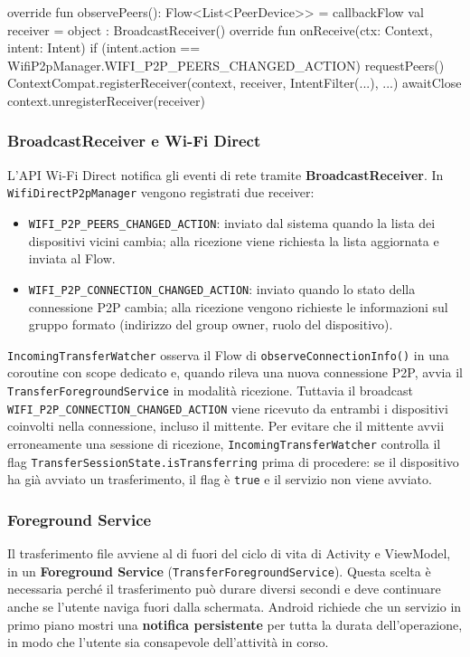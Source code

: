 \begin{codeblock}[language=Kotlin]
override fun observePeers(): Flow<List<PeerDevice>> = callbackFlow {
    val receiver = object : BroadcastReceiver() {
        override fun onReceive(ctx: Context, intent: Intent) {
            if (intent.action == WifiP2pManager.WIFI_P2P_PEERS_CHANGED_ACTION)
                requestPeers()
        }
    }
    ContextCompat.registerReceiver(context, receiver, IntentFilter(...), ...)
    awaitClose { context.unregisterReceiver(receiver) }
}
\end{codeblock}

\subsubsection*{BroadcastReceiver e Wi-Fi Direct}%
\label{subsec:broadcast}

L'API Wi-Fi Direct notifica gli eventi di rete tramite \textbf{Broad\-cast\-Receiver}. In \texttt{Wifi\-Direct\-P2p\-Manager} vengono registrati due receiver:

\begin{itemize}[label={--}, leftmargin=1.2cm]
    \item \texttt{WIFI\_P2P\_PEERS\_CHANGED\_ACTION}: inviato dal sistema quando la lista dei dispositivi vicini cambia; alla ricezione viene richiesta la lista aggiornata e inviata al Flow.
    \item \texttt{WIFI\_P2P\_CONNECTION\_CHANGED\_ACTION}: inviato quando lo stato della connessione P2P cambia; alla ricezione vengono richieste le informazioni sul gruppo formato (indirizzo del group owner, ruolo del dispositivo).
\end{itemize}

\texttt{Incoming\-Transfer\-Watcher} osserva il Flow di \texttt{observeConnectionInfo()} in una coroutine con scope dedicato e, quando rileva una nuova connessione P2P, avvia il \texttt{Transfer\-Foreground\-Service} in modalità ricezione. Tuttavia il broadcast \texttt{WIFI\_P2P\_CONNECTION\_CHANGED\_ACTION} viene ricevuto da entrambi i dispositivi coinvolti nella connessione, incluso il mittente. Per evitare che il mittente avvii erroneamente una sessione di ricezione, \texttt{Incoming\-Transfer\-Watcher} controlla il flag \texttt{Transfer\-Session\-State.isTransferring} prima di procedere: se il dispositivo ha già avviato un trasferimento, il flag è \texttt{true} e il servizio non viene avviato.

\subsubsection*{Foreground Service}

Il trasferimento file avviene al di fuori del ciclo di vita di Activity e ViewModel, in un \textbf{Foreground Service} (\texttt{TransferForegroundService}). Questa scelta è necessaria perché il trasferimento può durare diversi secondi e deve continuare anche se l'utente naviga fuori dalla schermata. Android richiede che un servizio in primo piano mostri una \textbf{notifica persistente} per tutta la durata dell'operazione, in modo che l'utente sia consapevole dell'attività in corso.
